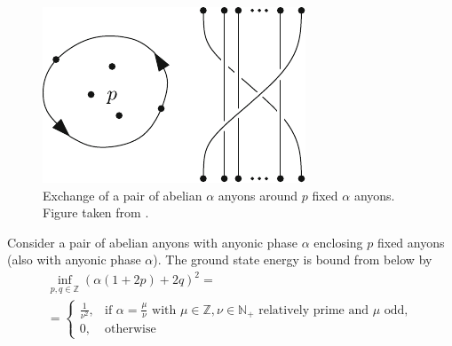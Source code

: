 \begin{figure}[h]
  \centering
  \includegraphics{img/interchange_loop_p.pdf}
  \caption{Exchange of a pair of abelian $α$ anyons around $p$ fixed $α$ anyons. Figure taken from \cite{lundholm-solovej}.}
  \label{fig:abelian Up}
\end{figure}


\begin{proposition}
  Consider a pair of abelian anyons with anyonic phase $α$ enclosing $p$ fixed anyons (also with anyonic phase $α$).
  The ground state energy is bound from below by
    \begin{gather*}
      \inf_{p,q∈ℤ} \left(α(1+2p)+2q\right)^2 =\\
      = \begin{cases}
        \frac{1}{ν^2}, & \text{if $α = \frac{μ}{ν}$ with $μ ∈ ℤ, ν ∈ ℕ_+$ relatively prime and $μ$ odd}, \\
        0, & \text{otherwise}
      \end{cases}
    \end{gather*}
\end{proposition}

